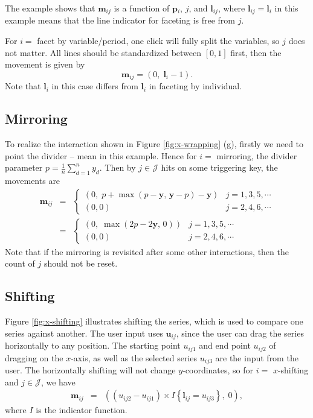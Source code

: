 \documentclass[12pt]{article}
\begin{document}
The example shows that $\mathbf{m}{}_{ij}$ is a function of $\mathbf{p}{}_{i}$,
$j$, and $\mathbf{l}_{ij}$, where $\mathbf{l}_{ij}=\mathbf{l}{}_i$ in this example
means that the line indicator for faceting is free from $j$.

For $i=$ facet by variable/period, one click will fully split
the variables, so $j$ does not matter. All lines should be
standardized between $[0,1]$ first, then the movement is given by
\[
\mathbf{m}{}_{ij} = (0,\; \mathbf{l}{}_i-1).
\]
Note that $\mathbf{l}{}_i$ in this case differs from
$\mathbf{l}{}_i$ in faceting by individual.

\subsection{Mirroring}

To realize the interaction shown in Figure \ref{fig:x-wrapping} (g),
firstly we need to point the divider -- mean in this example.
Hence for $i=$ mirroring, the divider parameter
$p = \frac{1}{n}\sum_{d=1}^{n}y_d$. Then by $j\in\mathcal{J}$
hits on some triggering key, the movements are
\begin{eqnarray*}
\mathbf{m}{}_{ij} & = & \begin{cases}
(0, \; p+\max(p-\mathbf{y},\,\mathbf{y}-p)-\mathbf{y}) & j=1,3,5,\cdots \\
(0,0) & j=2,4,6,\cdots
\end{cases}\\ & = & \begin{cases}
(0, \; \max(2p-2\mathbf{y},\,0)) & j=1,3,5,\cdots \\
(0,0) & j=2,4,6,\cdots
\end{cases}
\end{eqnarray*}
Note that if the mirroring is revisited after some other interactions,
then the count of $j$ should not be reset.

\subsection{Shifting}

Figure \ref{fig:x-shifting} illustrates shifting the series, which is used to compare one series against another. The user input uses $\mathbf{u}{}_{ij}$, since the user can drag the
series horizontally to any position. The starting point
$u_{ij1}$ and end point $u_{ij2}$ of dragging on the $x$-axis,
as well as the selected series $u_{ij3}$ are the input from the user.
The horizontally shifting will not change $y$-coordinates, so for
$i=$ $x$-shifting and $j\in\mathcal{J}$, we have
\begin{eqnarray*}
\mathbf{m}{}_{ij} & = &
((u_{ij2}-u_{ij1})\times I\left\{ \mathbf{l}{}_{ij}=u_{ij3}\right\}, \; 0),
\end{eqnarray*}
where $I$ is the indicator function.
\end{document}
